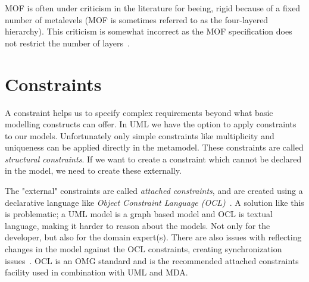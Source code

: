 MOF is often under criticism in the literature for beeing, rigid because of a fixed number of metalevels (MOF is sometimes referred to as the four-layered hierarchy). This criticism is somewhat incorrect as the MOF specification does not restrict the number of layers~\cite{OMG07UML}. %


\section{Constraints}
A constraint helps us to specify complex requirements beyond what basic modelling constructs can offer. In UML we have the option to apply constraints to our models. Unfortunately only simple constraints like multiplicity and uniqueness can be applied directly in the metamodel. These constraints are called \emph{structural constraints}. If we want to create a constraint which cannot be declared in the model, we need to create these externally. 

The "external" constraints are called \emph{attached constraints}, and are created using a declarative language like \emph{Object Constraint Language (OCL)}~\cite{OMG06OCL}. A solution like this is problematic; a UML model is a graph based model and OCL is textual language, making it harder to reason about the models. Not only for the developer, but also for the domain expert(s). There are also issues with reflecting changes in the model against the OCL constraints, creating synchronization issues~\cite{rutle_thesis_2010}. OCL is an OMG standard and is the recommended attached constraints facility used in combination with UML and MDA. 

